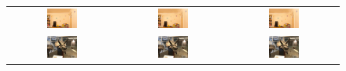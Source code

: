 \begin{figure}[h]
\begin{tabular}{ccc}
            \includegraphics[width=0.3\textwidth]{../o-3dgs/eval/playroom/test/ours_30000/gt/00000.png} &
            \includegraphics[width=0.3\textwidth]{../o-3dgs/eval/playroom/test/ours_30000/renders/00000.png} & 
            \includegraphics[width=0.3\textwidth]{../o-3dgs/eval/playroom/test/ours_30000/renders/00000.png} \\
            \includegraphics[width=0.3\textwidth]{../o-3dgs/eval/horns/test/ours_30000/gt/00000.png} &
            \includegraphics[width=0.3\textwidth]{../o-3dgs/eval/horns/test/ours_30000/renders/00000.png} & 
            \includegraphics[width=0.3\textwidth]{../o-3dgs/eval/horns/test/ours_30000/renders/00000.png} \\

\end{tabular}
\end{figure}
